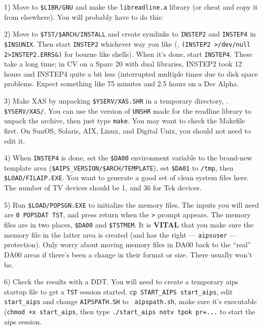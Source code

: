 \item{1)} Move to {\tt\$LIBR/GNU} and make the {\tt libreadline.a}
	  library (or cheat and copy it from elsewhere).  You will
	  probably have to do this:\medskip
{}
\item{2)} Move to {\tt \$TST/\$ARCH/INSTALL} and create symlinks to
	  {\tt INSTEP2} and {\tt INSTEP4} in {\tt\$INSUNIX}.  Then start
	  {\tt INSTEP2} whichever way you like (\eg, {\tt (INSTEP2
	  >/dev/null 2>IN\-STEP2.ERRS\&)} for bour\-ne like shells).
	  When it's done, start {\tt INSTEP4}.  These take a long time;
	  in CV on a Sparc 20 with dual libraries, INSTEP2 took 12
	  hours and INSTEP4 quite a bit less (interrupted multiple times
	  due to disk space problems.  Expect something like 75 minutes
	  and 2.5 hours on a Dec Alpha.
\item{3)} Make XAS by unpacking {\tt\$YSERV/XAS.SHR} in a temporary
	  directory, \eg. {\tt\$YSERV/XAS/}.  You can use the version of
	  {\tt UNSHR} made for the readline library to unpack the
	  archive, then just type {\tt make}.  You may want to check the
	  Makefile first.  On SunOS, Solaris, AIX, Linux, and Digital
	  Unix, you should not need to edit it.
\item{4)} When {\tt INSTEP4} is done, set the {\tt\$DA00} environment
	  variable to the brand-new template area
	  ({\tt\$AIPS\_VERSION/\-\$ARCH/\-TEM\-PLATE}), set {\tt\$DA01}
	  to {\tt /tmp}, then {\tt \$LOAD/FILAIP.EXE}.  You want to
	  generate a good set of clean system files here.  The number of
	  TV devices should be 1, and 36 for Tek devices.
\item{5)} Run {\tt \$LOAD/POPSGN.EXE} to initialize the memory files.
          The inputs you will need are {\tt 0 POPSDAT TST}, and press
          return when the {\tt >} prompt appears.  The memory files are
          in two places, {\tt\$DA00} and {\tt\$TSTMEM}.  It is {\bf
          VITAL} that you make sure the memory file in the latter area
          is created (and has the right --- {\tt aipsuser} ---
          protection).  Only worry about moving memory files in DA00
          back to the ``real'' DA00 areas if there's been a change in
          their format or size.  There usually won't be.
\item{6)} Check the results with a DDT.  You will need to create a
	  temporary aips startup file to get a {\tt TST} session
	  started.  {\tt cp START\_AIPS start\_aips}, edit {\tt
	  start\_aips} and change {\tt AIPSPATH.SH} to {\tt
	  aipspath.sh}, make sure it's executable ({\tt chmod +x
	  start\_aips}, then type {\tt ./start\_aips notv tpok pr=...}
	  to start the aips session.
\medskip

